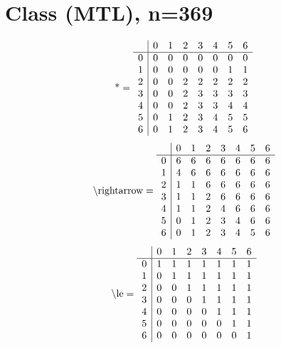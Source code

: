 \documentclass[11pt]{article}
\begin{document}
\section{Class (MTL), n=369}
\[\text{*} = 
\begin{array}{r | r r r r r r r}
 & 0 & 1 & 2 & 3 & 4 & 5 & 6 \\ \hline
0 & 0 & 0 & 0 & 0 & 0 & 0 & 0 \\
1 & 0 & 0 & 0 & 0 & 0 & 1 & 1 \\
2 & 0 & 0 & 2 & 2 & 2 & 2 & 2 \\
3 & 0 & 0 & 2 & 3 & 3 & 3 & 3 \\
4 & 0 & 0 & 2 & 3 & 3 & 4 & 4 \\
5 & 0 & 1 & 2 & 3 & 4 & 5 & 5 \\
6 & 0 & 1 & 2 & 3 & 4 & 5 & 6 \\
\end{array}
\]
\[\text{\textbackslash rightarrow} = 
\begin{array}{r | r r r r r r r}
 & 0 & 1 & 2 & 3 & 4 & 5 & 6 \\ \hline
0 & 6 & 6 & 6 & 6 & 6 & 6 & 6 \\
1 & 4 & 6 & 6 & 6 & 6 & 6 & 6 \\
2 & 1 & 1 & 6 & 6 & 6 & 6 & 6 \\
3 & 1 & 1 & 2 & 6 & 6 & 6 & 6 \\
4 & 1 & 1 & 2 & 4 & 6 & 6 & 6 \\
5 & 0 & 1 & 2 & 3 & 4 & 6 & 6 \\
6 & 0 & 1 & 2 & 3 & 4 & 5 & 6 \\
\end{array}
\]
\[\text{\textbackslash le} = 
\begin{array}{r | r r r r r r r}
 & 0 & 1 & 2 & 3 & 4 & 5 & 6 \\ \hline
0 & 1 & 1 & 1 & 1 & 1 & 1 & 1 \\
1 & 0 & 1 & 1 & 1 & 1 & 1 & 1 \\
2 & 0 & 0 & 1 & 1 & 1 & 1 & 1 \\
3 & 0 & 0 & 0 & 1 & 1 & 1 & 1 \\
4 & 0 & 0 & 0 & 0 & 1 & 1 & 1 \\
5 & 0 & 0 & 0 & 0 & 0 & 1 & 1 \\
6 & 0 & 0 & 0 & 0 & 0 & 0 & 1 \\
\end{array}
\]
\end{document}
